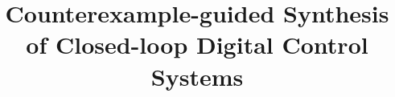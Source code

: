 \documentclass{sig-alternate-05-2015}
\begin{document}

\doi{}

\isbn{}

%

\title{Counterexample-guided Synthesis \\
of Closed-loop Digital Control Systems}
%
%
%
%
%
\end{document}
